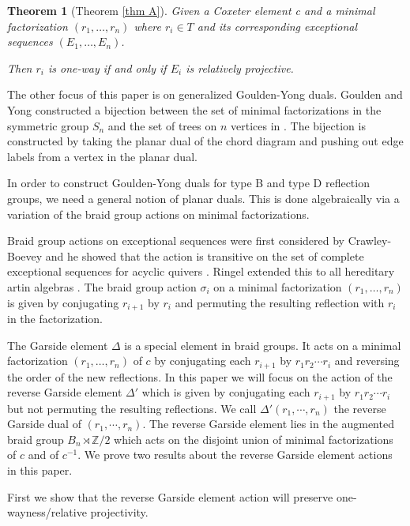 \documentclass[11pt]{amsart}
\newtheorem{thm}{Theorem}[section]
\begin{document}
\begin{thm}[Theorem \ref{thm A}]
    Given a Coxeter element c and a minimal factorization $(r_1,\dots,r_n)$ where $r_i \in T$ and its corresponding exceptional sequences $(E_1,\dots,E_n)$.

    Then $r_i$ is one-way if and only if $E_i$ is relatively projective.
\end{thm}

The other focus of this paper is on generalized Goulden-Yong duals.  Goulden and Yong constructed a bijection between the set of minimal factorizations in the symmetric group $S_n$ and the set of trees on $n$ vertices in \cite{MR1897927}. The bijection is constructed by taking the planar dual of the chord diagram and pushing out edge labels from a vertex in the planar dual. 

In order to construct Goulden-Yong duals for type B and type D reflection groups, we need a general notion of planar duals. This is done algebraically via a variation of the braid group actions on minimal factorizations.

Braid group actions on exceptional sequences were first considered by Crawley-Boevey and he showed that the action is transitive on the set of complete exceptional sequences for acyclic quivers \cite{MR1265279}. Ringel extended this to all hereditary artin algebras \cite{ringel1994braid}. The braid group action $\sigma_i$ on a minimal factorization $(r_1,\dots,r_n)$ is given by conjugating $r_{i+1}$ by $r_i$ and permuting the resulting reflection with $r_i$ in the factorization.

The Garside element $\Delta$ is a special element in braid groups. It acts on a minimal factorization $(r_1,\dots,r_n)$ of $c$ by conjugating each $r_{i+1}$ by $r_1r_2\cdots r_i$ and reversing the order of the new reflections. In this paper we will focus on the action of the reverse Garside element $\Delta'$ which is given by conjugating each $r_{i+1}$ by $r_1r_2\cdots r_i$ but not permuting the resulting reflections. We call $\Delta'(r_1,\cdots,r_n)$ the reverse Garside dual of $(r_1,\cdots,r_n)$. The reverse Garside element lies in the augmented braid group $B_n\rtimes \mathbb Z/2$ which acts on the disjoint union of minimal factorizations of $c$ and of $c^{-1}$. We prove two results about the reverse Garside element actions in this paper.



First we show that the reverse Garside element action will preserve one-wayness/relative projectivity.
\end{document}
